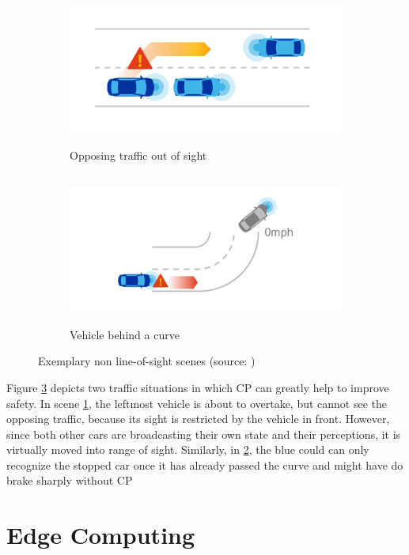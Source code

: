 \begin{figure}[h]
	
	\begin{subfigure}{0.5\textwidth}
		\includegraphics[width=1.0\linewidth, height=5cm]{98_images/nloss_2.png} 
		\caption{Opposing traffic out of sight}
		\label{fig:cp_use_cases_1}
	\end{subfigure}
	\begin{subfigure}{0.5\textwidth}
		\includegraphics[width=1.2\linewidth, height=5cm]{98_images/nloss_3.png}
		\caption{Vehicle behind a curve}
		\label{fig:cp_use_cases_2}
	\end{subfigure}
	
	\caption{Exemplary non line-of-sight scenes (source: \cite{QualcommTechnologiesInc.2017})}
	\label{fig:cp_use_cases}
\end{figure}

Figure \ref{fig:cp_use_cases} depicts two traffic situations in which CP can greatly help to improve safety. In scene \ref{fig:cp_use_cases_1}, the leftmost vehicle is about to overtake, but cannot see the opposing traffic, because its sight is restricted by the vehicle in front. However, since both other cars are broadcasting their own state and their perceptions, it is virtually moved into range of sight. Similarly, in \ref{fig:cp_use_cases_2}, the blue could can only recognize the stopped car once it has already passed the curve and might have do brake sharply without CP

\section{Edge Computing}
\label{sec:background:edge_computing}

